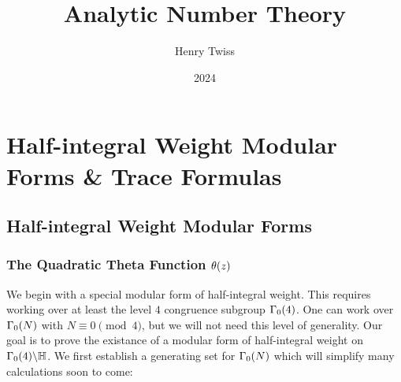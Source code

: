 \documentclass[12pt,oneside]{book}
\title{Analytic Number Theory}
\author{Henry Twiss}
\date{2024}
\begin{document}
\maketitle
\pagestyle{empty}
\tableofcontents
\setcounter{page}{0}

\part{Half-integral Weight Modular Forms \& Trace Formulas}
  \chapter{Half-integral Weight Modular Forms}
    \section{The Quadratic Theta Function \texorpdfstring{$\theta(z)$}{O(z)}}
      We begin with a special modular form of half-integral weight. This requires working over at least the level $4$ congruence subgroup $\Gamma_{0}(4)$. One can work over $\Gamma_{0}(N)$ with $N \equiv 0 \pmod{4}$, but we will not need this level of generality. Our goal is to prove the existance of a modular form of half-integral weight on $\Gamma_{0}(4)\backslash\mathbb{H}$. We first establish a generating set for $\Gamma_{0}(N)$ which will simplify many calculations soon to come:
\end{document}
